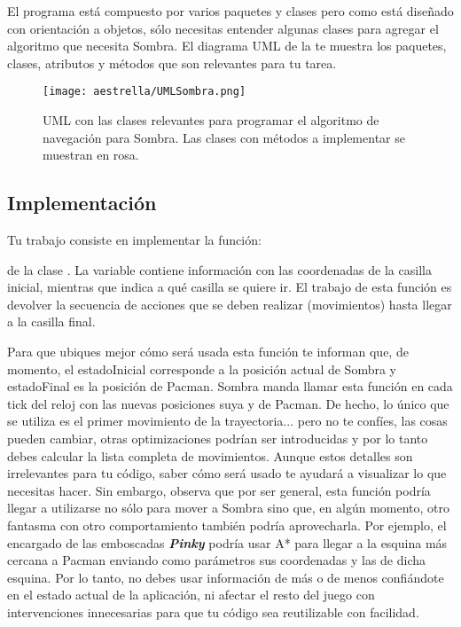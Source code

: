 El programa está compuesto por varios paquetes y clases pero como está diseñado con orientación a objetos, sólo necesitas entender algunas clases para agregar el algoritmo que necesita Sombra.  El diagrama UML de la  te muestra los paquetes, clases, atributos y métodos que son relevantes para tu tarea.

\begin{sidewaysfigure}
  \centering
  \texttt{[image: aestrella/UMLSombra.png]}
  \caption{UML con las clases relevantes para programar el algoritmo de navegación para Sombra.  Las clases con métodos a implementar se muestran en rosa.}
  \label{fig:umlestrella}
\end{sidewaysfigure}

\subsection{Implementaci\'on}

Tu trabajo consiste en implementar la función:


\noindent de la clase .
La variable  contiene información con las coordenadas de la casilla inicial, mientras que  indica a qué casilla se quiere ir.  El trabajo de esta función es devolver la secuencia de acciones que se deben realizar (movimientos) hasta llegar a la casilla final.

Para que ubiques mejor cómo será usada esta función te informan que, de momento, el estadoInicial corresponde a la posición actual de Sombra y estadoFinal es la posición de Pacman.  Sombra manda llamar esta función en cada tick del reloj con las nuevas posiciones suya y de Pacman.  De hecho, lo único que se utiliza es el primer movimiento de la trayectoria... pero no te confíes, las cosas pueden cambiar, otras optimizaciones podrían ser introducidas y por lo tanto debes calcular la lista completa de movimientos.  Aunque estos detalles son irrelevantes para tu código, saber cómo será usado te ayudará a visualizar lo que necesitas hacer.  Sin embargo, observa que por ser general, esta función podría llegar a utilizarse no sólo para mover a Sombra sino que, en algún momento, otro fantasma con otro comportamiento también podría aprovecharla.  Por ejemplo, el encargado de las emboscadas \textbf{\textit{Pinky}} podría usar A* para llegar a la esquina más cercana a Pacman enviando como parámetros sus coordenadas y las de dicha esquina.  Por lo tanto, no debes usar información de más o de menos confiándote en el estado actual de la aplicación, ni afectar el resto del juego con intervenciones innecesarias para que tu código sea reutilizable con facilidad.

